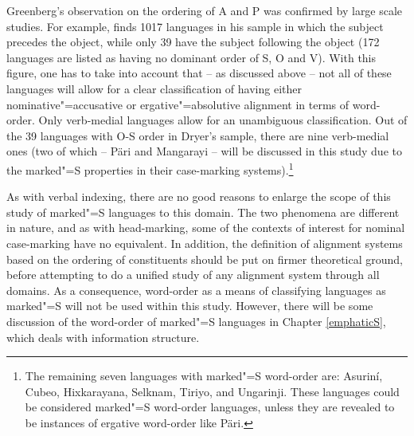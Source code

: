 Greenberg's observation on the ordering of A and P was confirmed by large scale studies. 
For example, \citet{WALS81} finds 1017 languages in his sample in which the subject precedes the object, while only 39 have the subject following the object (172 languages are listed as having no dominant order of S, O and V). 
With this figure, one has to take into account that -- as discussed above -- not all of these languages will allow for a clear classification of having either nominative"=accusative or ergative"=absolutive alignment in terms of word-order. 
Only verb-medial languages allow for an unambiguous classification. Out of the 39 languages with O-S order in Dryer's sample, there are nine verb-medial ones (two of which -- P\"ari and Mangarayi -- will be discussed in this study due to the marked"=S properties in their case-marking systems).\footnote{The remaining seven languages with marked"=S word-order are: Asurin\'i, Cubeo, Hixkarayana, Selknam, Tiriyo, and Ungarinji.  These languages could be considered marked"=S word-order languages, unless they are revealed to be instances of ergative word-order like P\"ari.}  

As with verbal indexing, there are no good reasons to enlarge the scope of this study of marked"=S languages to this domain.
The two phenomena are different in nature, and as with head-marking, some of the contexts of interest for nominal case-marking have no equivalent.
In addition, the definition of alignment systems based on the ordering of constituents should be put on firmer theoretical ground, before attempting to do a unified study of any alignment system through all domains. 
As a consequence, word-order as a means of classifying languages as marked"=S will not be used within this study. 
However, there will be some discussion of the word-order of marked"=S languages in Chapter \ref{emphaticS}, which deals with information structure.  

